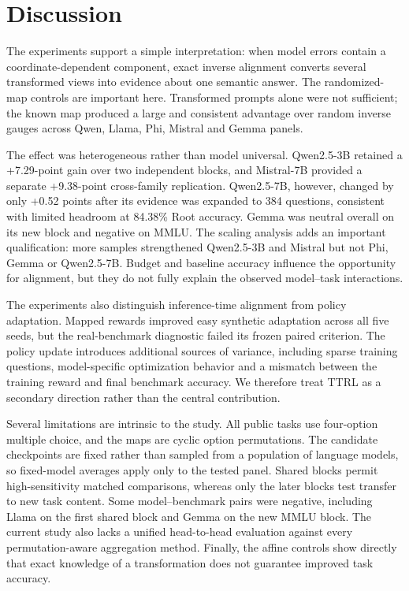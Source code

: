 \documentclass[11pt]{article}
\begin{document}
\section{Discussion}

The experiments support a simple interpretation: when model errors contain a coordinate-dependent component, exact inverse alignment converts several transformed views into evidence about one semantic answer. The randomized-map controls are important here. Transformed prompts alone were not sufficient; the known map produced a large and consistent advantage over random inverse gauges across Qwen, Llama, Phi, Mistral and Gemma panels.

The effect was heterogeneous rather than model universal. Qwen2.5-3B retained a +7.29-point gain over two independent blocks, and Mistral-7B provided a separate +9.38-point cross-family replication. Qwen2.5-7B, however, changed by only +0.52 points after its evidence was expanded to 384 questions, consistent with limited headroom at 84.38\% Root accuracy. Gemma was neutral overall on its new block and negative on MMLU. The scaling analysis adds an important qualification: more samples strengthened Qwen2.5-3B and Mistral but not Phi, Gemma or Qwen2.5-7B. Budget and baseline accuracy influence the opportunity for alignment, but they do not fully explain the observed model--task interactions.

The experiments also distinguish inference-time alignment from policy adaptation. Mapped rewards improved easy synthetic adaptation across all five seeds, but the real-benchmark diagnostic failed its frozen paired criterion. The policy update introduces additional sources of variance, including sparse training questions, model-specific optimization behavior and a mismatch between the training reward and final benchmark accuracy. We therefore treat TTRL as a secondary direction rather than the central contribution.

Several limitations are intrinsic to the study. All public tasks use four-option multiple choice, and the maps are cyclic option permutations. The candidate checkpoints are fixed rather than sampled from a population of language models, so fixed-model averages apply only to the tested panel. Shared blocks permit high-sensitivity matched comparisons, whereas only the later blocks test transfer to new task content. Some model--benchmark pairs were negative, including Llama on the first shared block and Gemma on the new MMLU block. The current study also lacks a unified head-to-head evaluation against every permutation-aware aggregation method. Finally, the affine controls show directly that exact knowledge of a transformation does not guarantee improved task accuracy.
\end{document}

